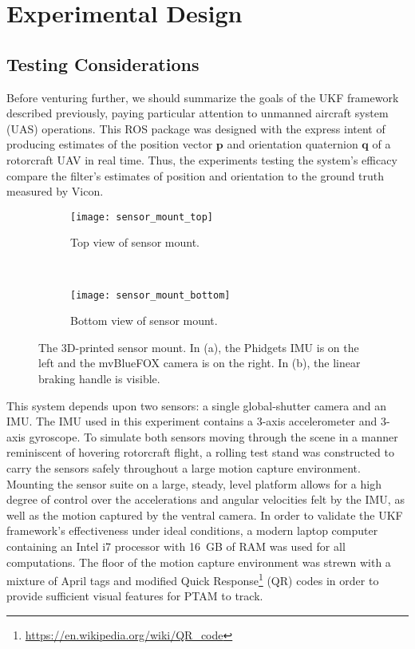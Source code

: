 \chapter{Experimental Design} \label{ch:Exp_Design}

\section{Testing Considerations}

Before venturing further, we should summarize the goals of the UKF framework described previously, paying particular attention to unmanned aircraft system (UAS) operations. This ROS package was designed with the express intent of producing estimates of the position vector $\mathbf{p}$ and orientation quaternion $\mathbf{q}$ of a rotorcraft UAV in real time. Thus, the experiments testing the system's efficacy compare the filter's estimates of position and orientation to the ground truth measured by Vicon.

\begin{figure}[t]
    \centering
    \begin{subfigure}[t]{0.5\textwidth}
        \centering
        \texttt{[image: sensor\_mount\_top]}
        \caption{Top view of sensor mount.}
    \end{subfigure}%
    ~ 
    \begin{subfigure}[t]{0.5\textwidth}
        \centering
        \texttt{[image: sensor\_mount\_bottom]}
        \caption{Bottom view of sensor mount.}
    \end{subfigure}
    \caption[3D-printed sensor mount]{The 3D-printed sensor mount. In (a), the Phidgets IMU is on the left and the mvBlueFOX camera is on the right. In (b), the linear braking handle is visible.}
    \label{fig:sensor_mount}
\end{figure}

This system depends upon two sensors: a single global-shutter camera and an IMU. The IMU used in this experiment contains a 3-axis accelerometer and 3-axis gyroscope. To simulate both sensors moving through the scene in a manner reminiscent of hovering rotorcraft flight, a rolling test stand was constructed to carry the sensors safely throughout a large motion capture environment. Mounting the sensor suite on a large, steady, level platform allows for a high degree of control over the accelerations and angular velocities felt by the IMU, as well as the motion captured by the ventral camera. In order to validate the UKF framework's effectiveness under ideal conditions, a modern laptop computer containing an Intel i7 processor with 16~GB of RAM was used for all computations. The floor of the motion capture environment was strewn with a mixture of April tags and modified Quick Response\footnote{\url{https://en.wikipedia.org/wiki/QR_code}} (QR) codes in order to provide sufficient visual features for PTAM to track.

